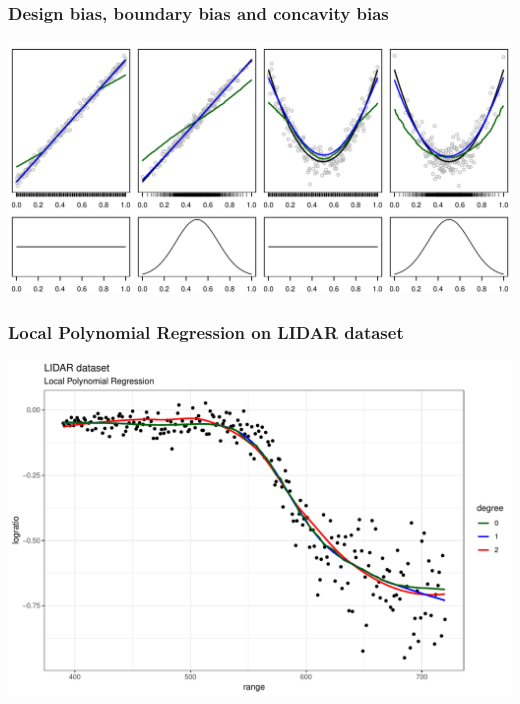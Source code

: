 \documentclass[pdf]{beamer}\usepackage[]{graphicx}\usepackage[]{color}
\makeatletter
\def\maxwidth{ %
  \ifdim\Gin@nat@width>\linewidth
    \linewidth
  \else
    \Gin@nat@width
  \fi
}
\newenvironment{knitrout}{}{} %
\makeatother
\begin{document}
\begin{frame}
\frametitle{Design bias, boundary bias and concavity bias}
\begin{knitrout}
\color{fgcolor}

{\centering \includegraphics[width=\maxwidth]{figure/loess_bias-1} 

}



\end{knitrout}
\end{frame}


\begin{frame}
\frametitle{Local Polynomial Regression on LIDAR dataset}
\begin{knitrout}
\color{fgcolor}

{\centering \includegraphics[width=\maxwidth]{figure/lidarLoess-1} 

}



\end{knitrout}
\end{frame}
\end{document}
